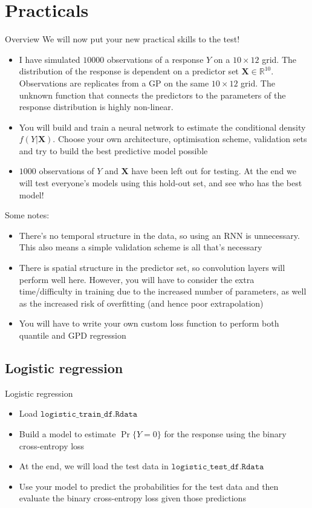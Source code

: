\documentclass{beamer}
\begin{document}
\section{Practicals}
\begin{frame}{Overview}
We will now put your new practical skills to the test!
\begin{itemize}
\item I have simulated $10000$ observations of a response $Y$ on a $10\times 12$ grid. The distribution of the response is dependent on a predictor set $\mathbf{X}\in\mathbb{R}^{10}$. Observations are replicates from a GP on the same $10\times 12$ grid. The unknown function that connects the predictors to the parameters of the response distribution is highly non-linear.
\item You will build and train a neural network to estimate the conditional density $f(Y|\mathbf{X})$. Choose your own architecture, optimisation scheme, validation sets and try to build the best predictive model possible
\item $1000$ observations of $Y$ and $\mathbf{X}$ have been left out for testing. At the end we will test everyone's models using this hold-out set, and see who has the best model!
\end{itemize}
\end{frame}
\begin{frame}
Some notes:
\begin{itemize}
\item There's no temporal structure in the data, so using an RNN is unnecessary. This also means a simple validation scheme is all that's necessary
\item There is spatial structure in the predictor set, so convolution layers will perform well here. However, you will have to consider the extra time/difficulty in training due to the increased number of parameters, as well as the increased risk of overfitting (and hence poor extrapolation)
\item You will have to write your own custom loss function to perform both quantile and GPD regression
\end{itemize}
\end{frame}
\subsection{Logistic regression}
\begin{frame}{Logistic regression}
\begin{itemize}
\item Load $\texttt{logistic\_train\_df.Rdata}$
\item Build a model to estimate $\Pr\{Y=0\}$ for the response using the binary cross-entropy loss
\item At the end, we will load the test data in  $\texttt{logistic\_test\_df.Rdata}$
\item Use your model to predict the probabilities for the test data and then evaluate the binary cross-entropy loss given those predictions
\end{itemize}
\end{frame}
\end{document}
